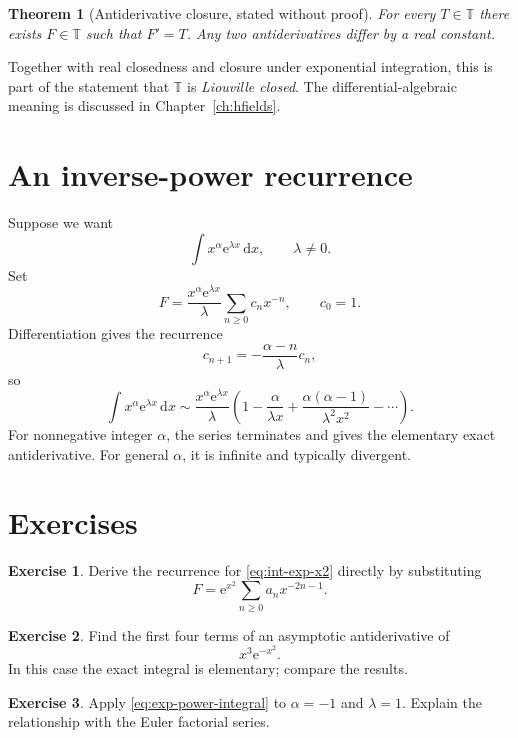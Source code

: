 \documentclass[11pt,openany]{book}
\theoremstyle{definition}
\newtheorem{exercise}{Exercise}[chapter]
\theoremstyle{plain}
\newtheorem{theorem}{Theorem}[chapter]
\theoremstyle{remark}
\newcommand{\T}{\mathbb{T}}
\newcommand{\dd}{\,\mathrm{d}}
\newcommand{\e}{\mathrm{e}}
\newcommand{\asym}{\sim}
\begin{document}
\begin{theorem}[Antiderivative closure, stated without proof]\label{thm:antiderivative}
For every $T\in\T$ there exists $F\in\T$ such that $F'=T$. Any two antiderivatives differ by a real constant.
\end{theorem}

Together with real closedness and closure under exponential integration, this is part of the statement that $\T$ is \emph{Liouville closed}. The differential-algebraic meaning is discussed in Chapter~\ref{ch:hfields}.

\section{An inverse-power recurrence}

Suppose we want
\[
 \int x^\alpha\e^{\lambda x}\dd x,
 \qquad \lambda\ne0.
\]
Set
\[
 F=\frac{x^\alpha\e^{\lambda x}}{\lambda}
 \sum_{n\ge0}c_nx^{-n},
 \qquad c_0=1.
\]
Differentiation gives the recurrence
\[
 c_{n+1}=-\frac{\alpha-n}{\lambda}c_n,
\]
so
\begin{equation}\label{eq:exp-power-integral}
 \int x^\alpha\e^{\lambda x}\dd x
 \asym\frac{x^\alpha\e^{\lambda x}}{\lambda}
 \left(1-\frac{\alpha}{\lambda x}
 +\frac{\alpha(\alpha-1)}{\lambda^2x^2}-\cdots\right).
\end{equation}
For nonnegative integer $\alpha$, the series terminates and gives the elementary exact antiderivative. For general $\alpha$, it is infinite and typically divergent.

\section{Exercises}

\begin{exercise}
Derive the recurrence for \cref{eq:int-exp-x2} directly by substituting
\[
 F=\e^{x^2}\sum_{n\ge0}a_nx^{-2n-1}.
\]
\end{exercise}

\begin{exercise}
Find the first four terms of an asymptotic antiderivative of
\[
 x^3\e^{-x^2}.
\]
In this case the exact integral is elementary; compare the results.
\end{exercise}

\begin{exercise}
Apply \cref{eq:exp-power-integral} to $\alpha=-1$ and $\lambda=1$. Explain the relationship with the Euler factorial series.
\end{exercise}
\end{document}
